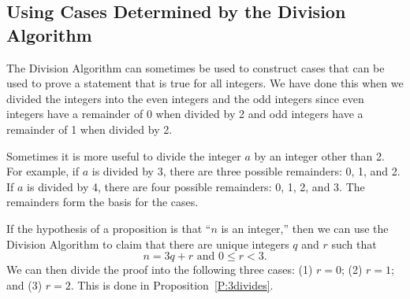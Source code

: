 \subsection*{Using Cases Determined by the Division Algorithm}
The Division Algorithm
%
 can sometimes be used to construct cases that can be used to prove a statement that is true for all integers.  We have done this when we divided the integers into the even integers and the odd integers since even integers have a remainder of 0 when divided by 2 and odd integers have a remainder of 1 when divided by 2.


Sometimes it is more useful to divide the integer  $a$  by an integer other than  2.  For example, if  $a$  is divided by  3, there are three possible remainders:  0, 1, and 2.  If  $a$  is divided by 4, there are four possible remainders:  0, 1, 2, and 3.  The remainders form the basis for the cases.  

If the hypothesis of a proposition is that  ``$n$  is an integer,'' then we can use the Division Algorithm to claim that there are unique integers  $q$  and  $r$  such that
\[
n = 3q + r\text{  and  }0 \leq r < 3.
\]
We can then divide the proof into the following three cases:  (1)  $r = 0$;  (2)  $r = 1$;  and (3) $r = 2$.  This is done in Proposition~\ref{P:3divides}.
%

